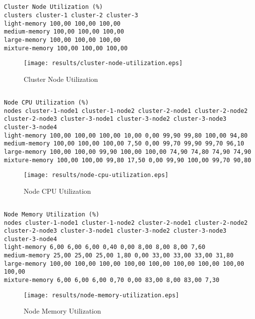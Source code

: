 \documentclass{elsart}
\begin{document}
\subsection{}

\begin{lstlisting}[caption={Cluster Node Utilization}]
Cluster Node Utilization (%)
clusters cluster-1 cluster-2 cluster-3
light-memory 100,00 100,00 100,00
medium-memory 100,00 100,00 100,00
large-memory 100,00 100,00 100,00
mixture-memory 100,00 100,00 100,00
\end{lstlisting}

\begin{figure}[ht]
\centering
\texttt{[image: results/cluster-node-utilization.eps]}
\caption{Cluster Node Utilization}\label{fig:cluster-node-utilization.eps}
\end{figure}

\subsection{}

\begin{lstlisting}[caption={Node CPU Utilization}]
Node CPU Utilization (%)
nodes cluster-1-node1 cluster-1-node2 cluster-2-node1 cluster-2-node2 cluster-2-node3 cluster-3-node1 cluster-3-node2 cluster-3-node3 cluster-3-node4
light-memory 100,00 100,00 100,00 10,00 0,00 99,90 99,80 100,00 94,80
medium-memory 100,00 100,00 100,00 7,50 0,00 99,70 99,90 99,70 96,10
large-memory 100,00 100,00 99,90 100,00 100,00 74,90 74,80 74,90 74,90
mixture-memory 100,00 100,00 99,80 17,50 0,00 99,90 100,00 99,70 90,80
\end{lstlisting}

\begin{figure}[ht]
\centering
\texttt{[image: results/node-cpu-utilization.eps]}
\caption{Node CPU Utilization}\label{fig:node-cpu-utilization.eps}
\end{figure}

\subsection{}

\begin{lstlisting}[caption={Node Memory Utilization}]
Node Memory Utilization (%)
nodes cluster-1-node1 cluster-1-node2 cluster-2-node1 cluster-2-node2 cluster-2-node3 cluster-3-node1 cluster-3-node2 cluster-3-node3 cluster-3-node4
light-memory 6,00 6,00 6,00 0,40 0,00 8,00 8,00 8,00 7,60
medium-memory 25,00 25,00 25,00 1,80 0,00 33,00 33,00 33,00 31,80
large-memory 100,00 100,00 100,00 100,00 100,00 100,00 100,00 100,00 100,00
mixture-memory 6,00 6,00 6,00 0,70 0,00 83,00 8,00 83,00 7,30
\end{lstlisting}

\begin{figure}[ht]
\centering
\texttt{[image: results/node-memory-utilization.eps]}
\caption{Node Memory Utilization}\label{fig:node-memory-utilization.eps}
\end{figure}
\end{document}
